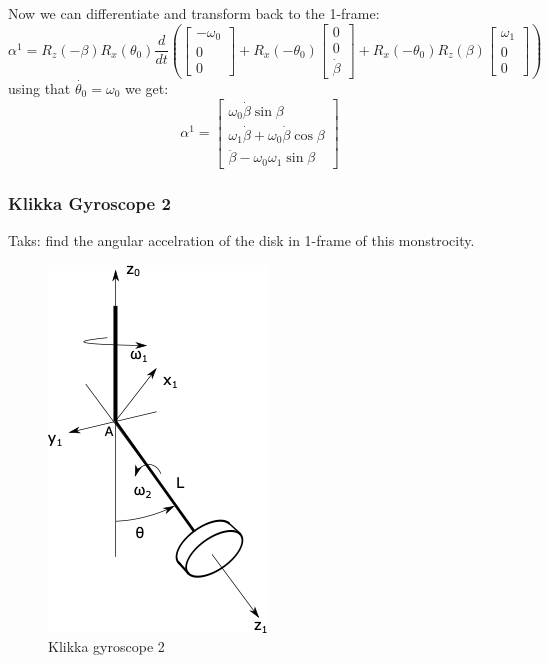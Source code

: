 Now we can differentiate and transform back to the 1-frame:
\begin{equation}
    \alpha^1 =
    R_z(-\beta)
    R_x(\theta_0)
    \frac{d}{dt}
    \left(
    \begin{bmatrix}
        -\omega_0 \\
        0\\
        0
    \end{bmatrix}
    +
    R_x(-\theta_0)
    \begin{bmatrix}
        0 \\
        0\\
        \dot{\beta}
    \end{bmatrix}
    +
    R_x(-\theta_0)R_z(\beta)
    \begin{bmatrix}
        \omega_1 \\
        0\\
        0
    \end{bmatrix}
    \right)
\end{equation}
using that $\dot{\theta_0} = \omega_0$ we get:
\begin{equation}
    \alpha^1 =
    \begin{bmatrix}
        \omega_0\dot{\beta}\sin\beta\\
        \omega_1\dot{\beta}+ \omega_0\dot{\beta}\cos\beta\\
        \ddot{\beta}-\omega_0\omega_1\sin\beta
    \end{bmatrix}
\end{equation}

\subsubsection{Klikka Gyroscope 2}
Taks: find the angular accelration of the disk in 1-frame of this monstrocity.

\begin{figure}[H]
    \centering
    \includegraphics[scale = 0.7]{figures/gyro.png}
    \caption{Klikka gyroscope 2}
    \label{fig:hardcoregyro2}
\end{figure}


